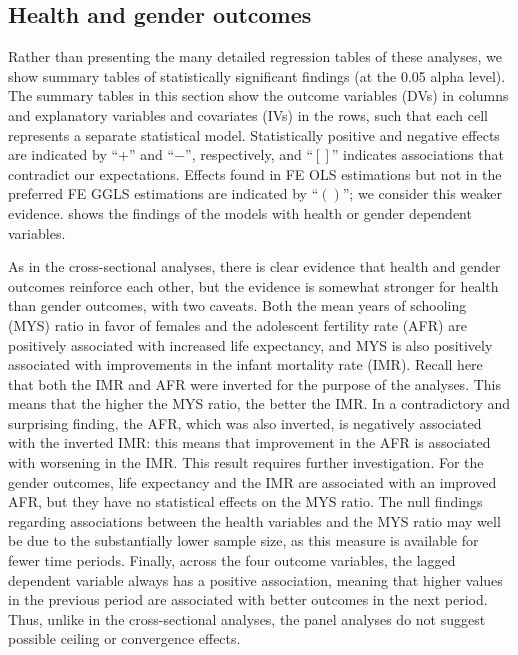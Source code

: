 \documentclass[12pt]{article}
\begin{document}
\subsection{Health and gender outcomes}

Rather than presenting the many detailed regression tables of these analyses, we show summary tables of statistically significant findings (at the 0.05 alpha level). The summary tables in this section show the outcome variables (DVs) in columns and explanatory variables and covariates (IVs) in the rows, such that each cell represents a separate statistical model. Statistically positive and negative effects are indicated by \enquote{$+$} and \enquote{$-$}, respectively, and \enquote{$[]$} indicates associations that contradict our expectations. Effects found in FE OLS estimations but not in the preferred FE GGLS estimations are indicated by \enquote{$()$}; we consider this weaker evidence.
 shows the findings of the models with health or gender dependent variables.



As in the cross-sectional analyses, there is clear evidence that health and gender outcomes reinforce each other, but the evidence is somewhat stronger for health than gender outcomes, with two caveats.
Both the mean years of schooling (MYS) ratio in favor of females and the adolescent fertility rate (AFR) are positively associated with increased life expectancy, and MYS is also positively associated with improvements in the infant mortality rate (IMR).
Recall here that both the IMR and AFR were inverted for the purpose of the analyses.
This means that the higher the MYS ratio, the better the IMR.
In a contradictory and surprising finding, the AFR, which was also inverted, is negatively associated with the inverted IMR: this means that improvement in the AFR is associated with worsening in the IMR. This result requires further investigation.
For the gender outcomes, life expectancy and the IMR are associated with an improved AFR, but they have no statistical effects on the MYS ratio.
The null findings regarding associations between the health variables and the MYS ratio may well be due to the substantially lower sample size, as this measure is available for fewer time periods.
Finally, across the four outcome variables, the lagged dependent variable always has a positive association, meaning that higher values in the previous period are associated with better outcomes in the next period. Thus, unlike in the cross-sectional analyses, the panel analyses do not suggest possible ceiling or convergence effects.
\end{document}
